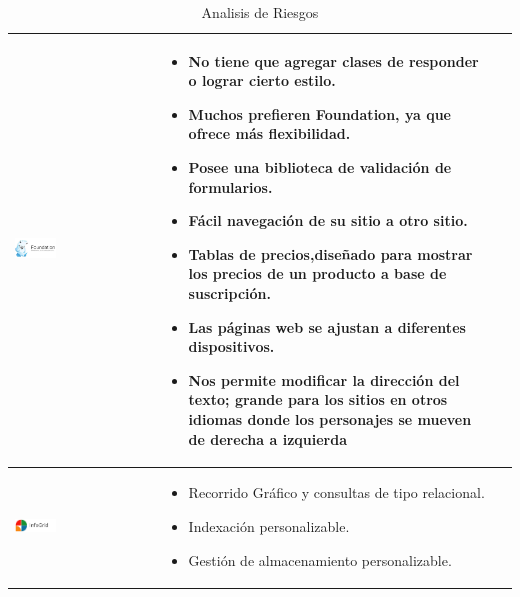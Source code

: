 \begin{table}[b!]
\begin{tabular}{|p{1cm}|ll}
        \hline
          \multicolumn{1}{|p{5cm}|}{\includegraphics[width=0.3\textwidth]{images/foundation}} & 
          \multicolumn{1}{p{10cm}|}{
          \begin{itemize}
        \item No tiene que agregar clases de responder o lograr cierto estilo.
        \item Muchos prefieren Foundation, ya que ofrece más flexibilidad. 
		\item Posee una biblioteca de validación  de formularios.
        \item Fácil navegación de su sitio a otro sitio.
        \item Tablas de precios,diseñado para mostrar los precios de un producto a base de suscripción.
        \item Las páginas web se ajustan a diferentes dispositivos.
        \item Nos permite modificar la dirección del texto; grande para los sitios en otros idiomas donde los personajes se mueven de derecha a izquierda
      \end{itemize}} \\ 
        \hline
          \multicolumn{1}{|p{3cm}|}{\includegraphics[width=0.3\textwidth]{images/InfoGrid}} & 
          \multicolumn{1}{p{8cm}|}{
          \begin{itemize}
        \item Recorrido Gráfico y consultas de tipo relacional.
        \item Indexación personalizable.
        \item Gestión de almacenamiento personalizable.
      \end{itemize}}\\ 
         \hline
      \end{tabular}
      \caption{Analisis de Riesgos}
      \label{Analisis de riesgos}
    \end{table}

